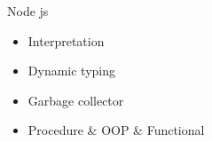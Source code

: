 \begin{frame}{Node js}
  \begin{center}
    \begin{itemize}
      \item Interpretation
      \item Dynamic typing
      \item Garbage collector
      \item Procedure \& OOP \& Functional
    \end{itemize}
  \end{center}
\end{frame}